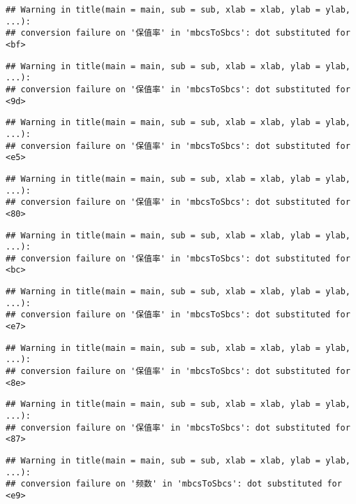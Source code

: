 \documentclass[]{article}
\begin{document}
\begin{verbatim}
## Warning in title(main = main, sub = sub, xlab = xlab, ylab = ylab, ...):
## conversion failure on '保值率' in 'mbcsToSbcs': dot substituted for <bf>
\end{verbatim}

\begin{verbatim}
## Warning in title(main = main, sub = sub, xlab = xlab, ylab = ylab, ...):
## conversion failure on '保值率' in 'mbcsToSbcs': dot substituted for <9d>
\end{verbatim}

\begin{verbatim}
## Warning in title(main = main, sub = sub, xlab = xlab, ylab = ylab, ...):
## conversion failure on '保值率' in 'mbcsToSbcs': dot substituted for <e5>
\end{verbatim}

\begin{verbatim}
## Warning in title(main = main, sub = sub, xlab = xlab, ylab = ylab, ...):
## conversion failure on '保值率' in 'mbcsToSbcs': dot substituted for <80>
\end{verbatim}

\begin{verbatim}
## Warning in title(main = main, sub = sub, xlab = xlab, ylab = ylab, ...):
## conversion failure on '保值率' in 'mbcsToSbcs': dot substituted for <bc>
\end{verbatim}

\begin{verbatim}
## Warning in title(main = main, sub = sub, xlab = xlab, ylab = ylab, ...):
## conversion failure on '保值率' in 'mbcsToSbcs': dot substituted for <e7>
\end{verbatim}

\begin{verbatim}
## Warning in title(main = main, sub = sub, xlab = xlab, ylab = ylab, ...):
## conversion failure on '保值率' in 'mbcsToSbcs': dot substituted for <8e>
\end{verbatim}

\begin{verbatim}
## Warning in title(main = main, sub = sub, xlab = xlab, ylab = ylab, ...):
## conversion failure on '保值率' in 'mbcsToSbcs': dot substituted for <87>
\end{verbatim}

\begin{verbatim}
## Warning in title(main = main, sub = sub, xlab = xlab, ylab = ylab, ...):
## conversion failure on '频数' in 'mbcsToSbcs': dot substituted for <e9>
\end{verbatim}
\end{document}
